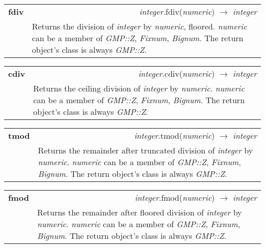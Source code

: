 \documentclass[pdftex,10pt]{article}
\newlength{\methwidth}
\newlength{\defnwidth}
\begin{document}
\begin{tabular}{p{\methwidth} l r}
\toprule
\textbf{fdiv} & & \textit{integer}.fdiv(\textit{numeric}) $\rightarrow$ \textit{integer}\\
\cmidrule(r){2-3}
& \multicolumn{2}{p{\defnwidth}}{
  Returns the division of \textit{integer} by \textit{numeric}, floored.
  \textit{numeric} can be a member of \textit{GMP::Z}, \textit{Fixnum}, \textit{Bignum}.
  The return object's class is always \textit{GMP::Z}.
}
\end{tabular}
\newline\newline

\begin{tabular}{p{\methwidth} l r}
\toprule
\textbf{cdiv} & & \textit{integer}.cdiv(\textit{numeric}) $\rightarrow$ \textit{integer}\\
\cmidrule(r){2-3}
& \multicolumn{2}{p{\defnwidth}}{
  Returns the ceiling division of \textit{integer} by \textit{numeric}.
  \textit{numeric} can be a member of \textit{GMP::Z}, \textit{Fixnum}, \textit{Bignum}.
  The return object's class is always \textit{GMP::Z}.
}
\end{tabular}
\newline\newline

\begin{tabular}{p{\methwidth} l r}
\toprule
\textbf{tmod} & & \textit{integer}.tmod(\textit{numeric}) $\rightarrow$ \textit{integer}\\
\cmidrule(r){2-3}
& \multicolumn{2}{p{\defnwidth}}{
  Returns the remainder after truncated division of \textit{integer} by \textit{numeric}.
  \textit{numeric} can be a member of \textit{GMP::Z}, \textit{Fixnum}, \textit{Bignum}.
  The return object's class is always \textit{GMP::Z}.
}
\end{tabular}
\newline\newline

\begin{tabular}{p{\methwidth} l r}
\toprule
\textbf{fmod} & & \textit{integer}.fmod(\textit{numeric}) $\rightarrow$ \textit{integer}\\
\cmidrule(r){2-3}
& \multicolumn{2}{p{\defnwidth}}{
  Returns the remainder after floored division of \textit{integer} by \textit{numeric}.
  \textit{numeric} can be a member of \textit{GMP::Z}, \textit{Fixnum}, \textit{Bignum}.
  The return object's class is always \textit{GMP::Z}.
}
\end{tabular}
\newline\newline
\end{document}
